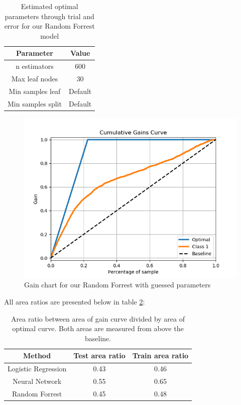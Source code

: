 \documentclass[12pt]{article}
\numberwithin{figure}{section}
\begin{document}
\begin{table}[H]
\centering
\begin{tabular}{c|c}
Parameter & Value \\ \hline
n estimators & 600 \\
Max leaf nodes & 30 \\
Min samples leaf & Default \\
Min samples split & Default
\end{tabular}
\caption{Estimated optimal parameters through trial and error for our Random Forrest model}
\label{tabR:RFparameters2}
\end{table}
\begin{figure}[H]
\centering
\includegraphics[scale=0.8]{../figures/gain-RF.png}
\caption{Gain chart for our Random Forrest with guessed parameters}
\label{figR:randomforrest}
\end{figure}
All area ratios are presented below in table \ref{tabR:arearatio}:
\begin{table}[H]
\centering
\begin{tabular}{c|c|c}
Method & Test area ratio & Train area ratio \\ \hline
Logistic Regression & 0.43 & 0.46 \\
Neural Network & 0.55 & 0.65 \\
Random Forrest & 0.45 & 0.48 \\ \hline
\end{tabular}
\caption{Area ratio between area of gain curve divided by area of optimal curve. Both areas are measured from above the baseline.}
\label{tabR:arearatio}
\end{table}
\end{document}
